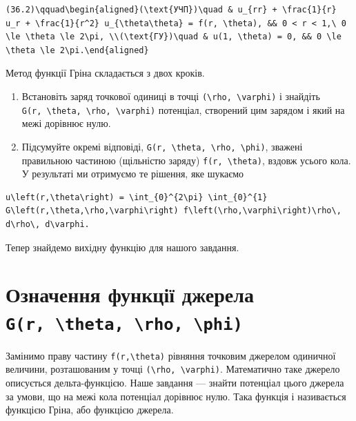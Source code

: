 \documentclass[
  ukrainian,
]{article}
\begin{document}
\begin{verbatim}
(36.2)\qquad\begin{aligned}(\text{УЧП})\quad & u_{rr} + \frac{1}{r} u_r + \frac{1}{r^2} u_{\theta\theta} = f(r, \theta), && 0 < r < 1,\ 0 \le \theta \le 2\pi, \\(\text{ГУ})\quad & u(1, \theta) = 0, && 0 \le \theta \le 2\pi.\end{aligned}
\end{verbatim}

Метод функції Гріна складається з двох кроків.

\begin{enumerate}
\def\labelenumi{\arabic{enumi}.}
\item
  Встановіть заряд точкової одиниці в точці
  \texttt{(\textbackslash{}rho,\ \textbackslash{}varphi)} і знайдіть
  \texttt{G(r,\ \textbackslash{}theta,\ \textbackslash{}rho,\ \textbackslash{}varphi)}
  потенціал, створений цим зарядом і який на межі дорівнює нулю.
\item
  Підсумуйте окремі відповіді,
  \texttt{G(r,\ \textbackslash{}theta,\ \textbackslash{}rho,\ \textbackslash{}phi)},
  зважені правильною частиною (щільністю заряду)
  \texttt{f(r,\ \textbackslash{}theta)}, вздовж усього кола. У
  результаті ми отримуємо те рішення, яке шукаємо
\end{enumerate}

\begin{verbatim}
u\left(r,\theta\right) = \int_{0}^{2\pi} \int_{0}^{1} G\left(r,\theta,\rho,\varphi\right) f\left(\rho,\varphi\right)\rho\, d\rho\, d\varphi.
\end{verbatim}

Тепер знайдемо вихідну функцію для нашого завдання.

\section{\texorpdfstring{Означення функції джерела
\texttt{G(r,\ \textbackslash{}theta,\ \textbackslash{}rho,\ \textbackslash{}phi)}}{Означення функції джерела G(r, \textbackslash theta, \textbackslash rho, \textbackslash phi)}}\label{ux43eux437ux43dux430ux447ux435ux43dux43dux44f-ux444ux443ux43dux43aux446ux456ux457-ux434ux436ux435ux440ux435ux43bux430-gr-theta-rho-phi}

Замінимо праву частину \texttt{f(r,\textbackslash{}theta)} рівняння
точковим джерелом одиничної величини, розташованим у точці
\texttt{(\textbackslash{}rho,\ \textbackslash{}varphi)}. Математично
таке джерело описується дельта-функцією. Наше завдання --- знайти
потенціал цього джерела за умови, що на межі кола потенціал дорівнює
нулю. Така функція і називається функцією Гріна, або функцією джерела.
\end{document}
